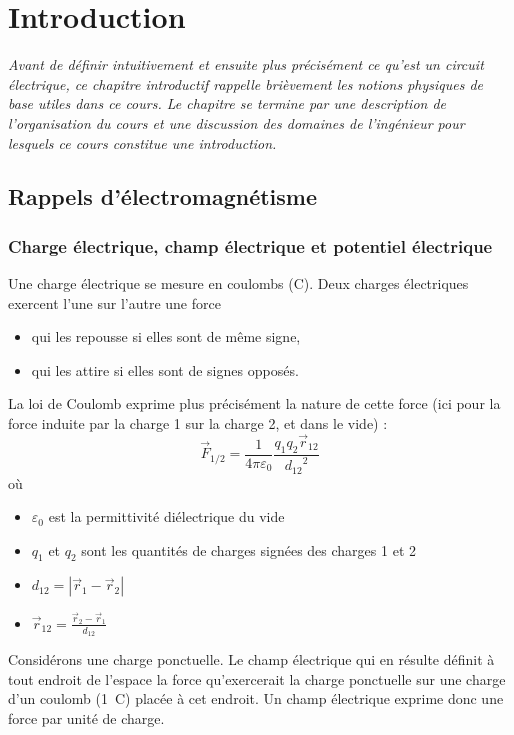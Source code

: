 
\chapter{Introduction}

\textit{Avant de définir intuitivement et ensuite plus précisément ce qu'est un circuit électrique, ce chapitre introductif rappelle brièvement les notions physiques de base utiles dans ce cours. Le chapitre se termine par une description de l'organisation du cours et une discussion des domaines de l'ingénieur pour lesquels ce cours constitue une introduction.}

\section{Rappels d'électromagnétisme}

\subsection{Charge électrique, champ électrique et potentiel électrique}
Une charge électrique se mesure en coulombs (C).
Deux charges électriques exercent l'une sur l'autre une force 
\begin{itemize}
	\item qui les repousse si elles sont de même signe,
	\item qui les attire si elles sont de signes opposés.
\end{itemize}
La loi de Coulomb exprime plus précisément la nature de cette force (ici pour la force induite par la charge 1 sur la charge 2, et dans le vide) :
$$\vec{F}_{1/2} = \frac{1}{4 \pi \varepsilon_0} \frac{q_1 q_2 \vec{r}_{12}} {{d_{12}}^2}$$
où 
\begin{itemize}
	\item $\varepsilon_0$ est la permittivité diélectrique du vide
	\item $q_1$ et $q_2$ sont les quantités de charges signées des charges 1 et 2
	\item $d_{12} = |\vec{r}_1 - \vec{r}_2|$
	\item $\vec{r}_{12} = \frac{\vec{r}_2- \vec{r}_1}{d_{12}}$
\end{itemize}

Considérons une charge ponctuelle. Le champ électrique qui en résulte définit à tout endroit de l'espace la force qu'exercerait la charge ponctuelle sur une charge d'un coulomb (1~C) placée à cet endroit. Un champ électrique exprime donc une force par unité de charge.

